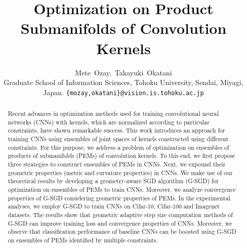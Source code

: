 \documentclass[10pt,journal,compsoc]{IEEEtran}
\theoremstyle{definition}
\theoremstyle{definition}
\theoremstyle{remark}
\theoremstyle{remark}
\theoremstyle{remark}
\begin{document}
 


\title{Optimization on Product Submanifolds of Convolution Kernels}

\author{Mete~Ozay,~Takayuki~Okatani\\
	Graduate School of Information Sciences, Tohoku University, Sendai, Miyagi, Japan.
	{\tt\small \{mozay,okatani\}@vision.is.tohoku.ac.jp} }


\maketitle


\begin{abstract} 
Recent advances in optimization methods used for training convolutional neural networks (CNNs) with kernels, which are normalized according to particular constraints, have shown remarkable success. This work introduces an approach for training CNNs using ensembles of joint spaces of kernels constructed using different constraints. For this purpose, we address a problem of optimization on ensembles of products of  submanifolds (PEMs) of convolution kernels. To this end, we first propose three strategies to construct ensembles of PEMs in CNNs. Next, we expound their geometric properties (metric and curvature properties) in CNNs. We make use of our theoretical results by developing a geometry-aware SGD algorithm (G-SGD) for optimization on ensembles of PEMs to train CNNs. Moreover, we analyze convergence properties of G-SGD considering geometric properties of PEMs. In the experimental analyses, we employ G-SGD to train CNNs on Cifar-10, Cifar-100 and Imagenet datasets. The results show that geometric adaptive step size computation methods of G-SGD can improve training loss and  convergence properties of CNNs. Moreover, we observe that classification performance of baseline CNNs can be boosted using G-SGD on ensembles of PEMs  identified by multiple constraints. 
\end{abstract} 
\end{document}
